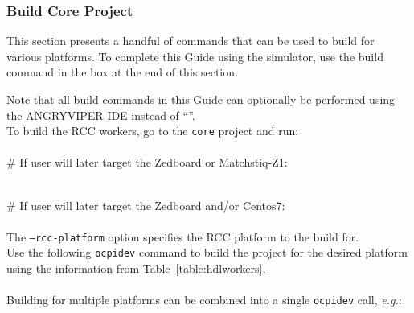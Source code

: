 
\subsubsection{Build Core Project}
This section presents a handful of commands that can be used to build for various platforms. To complete this Guide using the  simulator, use the build command in the box at the end of this section.
\begin{center}
\end{center}

Note that all build commands in this Guide can optionally be performed using the ANGRYVIPER IDE instead of ``''.\\

To build the RCC workers, go to the \texttt{core} project and run:\\ \\
\# If user will later target the Zedboard or Matchstiq-Z1:\\
\\
\OcpidevBuild

\# If user will later target the Zedboard and/or Centos7:\\
\\

The \texttt{--rcc-platform} option specifies the RCC platform to the build for.\\

Use the following \verb+ocpidev+ command to build the project for the desired platform using the information from Table~\ref{table:hdlworkers}.\\

 \\

Building for multiple platforms can be combined into a single \texttt{ocpidev} call, \textit{e.g.}:\\

 \\

